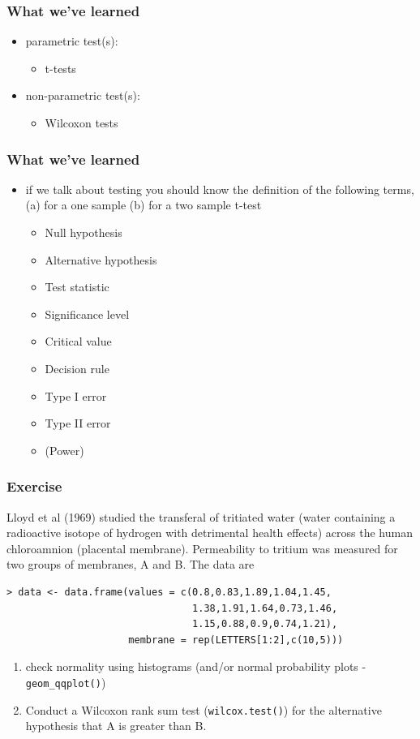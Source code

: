 \documentclass[xcolor={table}]{beamer}
\begin{document}
\begin{frame}\frametitle{What we've learned}
  \begin{itemize}
  \item parametric test(s):
    \begin{itemize}
    \item t-tests
    \end{itemize}
  \item non-parametric test(s):
    \begin{itemize}
    \item Wilcoxon tests
    \end{itemize}
  \end{itemize}
\end{frame}

\begin{frame}\frametitle{What we've learned}
  \begin{itemize}
  \item if we talk about testing you should know the definition of the following terms, (a)  for a one sample (b) for a two sample t-test 
    \begin{itemize}
    \item Null hypothesis
    \item Alternative hypothesis
    \item Test statistic
    \item Significance level
    \item Critical value
    \item Decision rule
    \item Type I error
    \item Type II error
    \item (Power)
    \end{itemize}
  \end{itemize}
\end{frame}

\begin{frame}[fragile]\frametitle{Exercise}
Lloyd et al (1969) studied the transferal of tritiated water (water containing a radioactive isotope of hydrogen with detrimental health effects) across the human chloroamnion (placental membrane). Permeability to tritium was measured for two groups of membranes, A and B. The data are\small
\begin{verbatim}
> data <- data.frame(values = c(0.8,0.83,1.89,1.04,1.45,
                                1.38,1.91,1.64,0.73,1.46,
                                1.15,0.88,0.9,0.74,1.21),
                     membrane = rep(LETTERS[1:2],c(10,5)))
\end{verbatim}\normalsize
\begin{enumerate}
  \item check normality using histograms (and/or normal probability plots - \texttt{geom\_qqplot()})
  \item Conduct a Wilcoxon rank sum test (\texttt{wilcox.test()}) for the alternative hypothesis that A is greater than B.
  \end{enumerate}
\end{frame}
\end{document}
